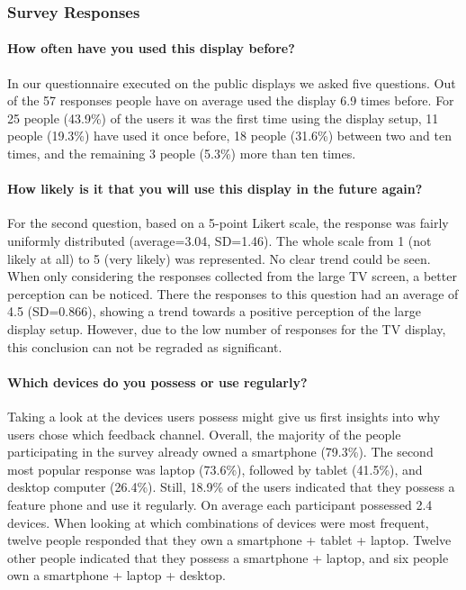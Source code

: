 	






	\subsubsection{Survey Responses}
	\label{5:results:survey}




	\paragraph{How often have you used this display before?}
	In our questionnaire executed on the public displays we asked five questions. Out of the 57 responses people have on average used the display 6.9 times before. For 25 people (43.9\%) of the users it was the first time using the display setup, 11 people (19.3\%) have used it once before, 18 people (31.6\%) between two and ten times, and the remaining 3 people (5.3\%) more than ten times.

	\paragraph{How likely is it that you will use this display in the future again?}
	For the second question, based on a 5-point Likert scale, the response was fairly uniformly distributed (average=3.04, SD=1.46). The whole scale from 1 (not likely at all) to 5 (very likely) was represented. No clear trend could be seen. When only considering the responses collected from the large TV screen, a better perception can be noticed. There the responses to this question had an average of 4.5 (SD=0.866), showing a trend towards a positive perception of the large display setup. However, due to the low number of responses for the TV display, this conclusion can not be regraded as significant. 

	\paragraph{Which devices do you possess or use regularly?}
	Taking a look at the devices users possess might give us first insights into why users chose which feedback channel. Overall, the majority of the people participating in the survey already owned a smartphone (79.3\%). The second most popular response was laptop (73.6\%), followed by tablet (41.5\%), and desktop computer (26.4\%). Still, 18.9\% of the users indicated that they possess a feature phone and use it regularly. On average each participant possessed 2.4 devices. 
	When looking at which combinations of devices were most frequent, twelve people responded that they own a smartphone + tablet + laptop. Twelve other people indicated that they possess a smartphone + laptop, and six people own a smartphone + laptop + desktop.

